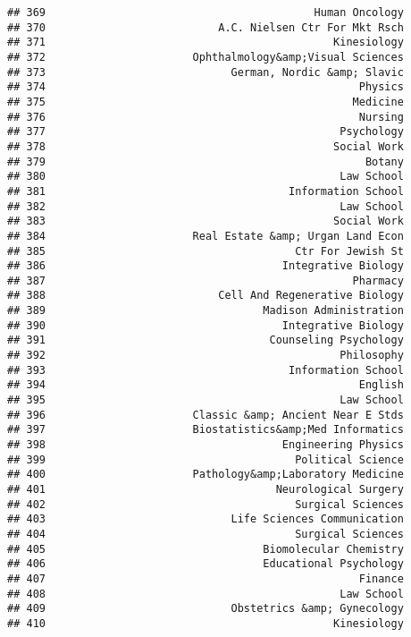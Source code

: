 \documentclass[
]{article}
\begin{document}
\begin{verbatim}
## 369                                          Human Oncology
## 370                           A.C. Nielsen Ctr For Mkt Rsch
## 371                                             Kinesiology
## 372                       Ophthalmology&amp;Visual Sciences
## 373                             German, Nordic &amp; Slavic
## 374                                                 Physics
## 375                                                Medicine
## 376                                                 Nursing
## 377                                              Psychology
## 378                                             Social Work
## 379                                                  Botany
## 380                                              Law School
## 381                                      Information School
## 382                                              Law School
## 383                                             Social Work
## 384                       Real Estate &amp; Urgan Land Econ
## 385                                       Ctr For Jewish St
## 386                                     Integrative Biology
## 387                                                Pharmacy
## 388                           Cell And Regenerative Biology
## 389                                  Madison Administration
## 390                                     Integrative Biology
## 391                                   Counseling Psychology
## 392                                              Philosophy
## 393                                      Information School
## 394                                                 English
## 395                                              Law School
## 396                       Classic &amp; Ancient Near E Stds
## 397                       Biostatistics&amp;Med Informatics
## 398                                     Engineering Physics
## 399                                       Political Science
## 400                       Pathology&amp;Laboratory Medicine
## 401                                    Neurological Surgery
## 402                                       Surgical Sciences
## 403                             Life Sciences Communication
## 404                                       Surgical Sciences
## 405                                  Biomolecular Chemistry
## 406                                  Educational Psychology
## 407                                                 Finance
## 408                                              Law School
## 409                             Obstetrics &amp; Gynecology
## 410                                             Kinesiology

\end{verbatim}
\end{document}

